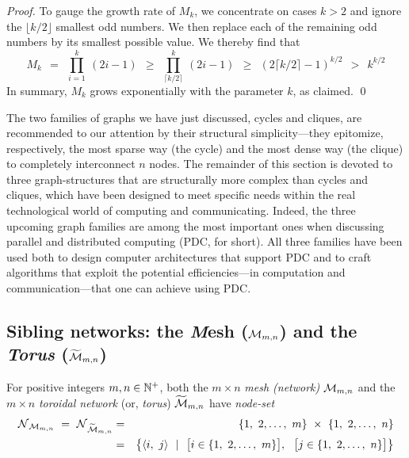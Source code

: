 \begin{proof}
\hspace*{.25in}{\em $M_k$ is the product of the first $k$ odd numbers.}

\noindent
To gauge the growth rate of $M_k$, we concentrate on cases $k > 2$ and
ignore the $\lfloor k/2 \rfloor$ smallest odd numbers.  We then
replace each of the remaining odd numbers by its smallest possible
value.  We thereby find that
\[
M_k \ \ =    \ \ \prod_{i=1}^k \ (2i-1)
    \ \ \geq \ \ \prod_{\lceil k/2 \rceil}^k \ (2i-1)
    \ \ \geq \ \ \left( 2 \lceil k/2 \rceil -1 \right)^{k/2}
    \ \ >    \ \ k^{k/2}
\]
In summary, $M_k$ grows exponentially with the parameter $k$, as claimed.
\qed
\end{proof}


\bigskip

The two families of graphs we have just discussed, cycles and cliques,
are recommended to our attention by their structural simplicity---they
epitomize, respectively, the most sparse way (the cycle) and the most
dense way (the clique) to completely interconnect $n$ nodes.  The
remainder of this section is devoted to three graph-structures that
are structurally more complex than cycles and cliques, which have been
designed to meet specific needs within the real technological world of
computing and communicating.  Indeed, the three upcoming graph
families are among the most important ones when discussing parallel
and distributed computing (PDC, for short).  All three families have
been used both to design computer architectures that support PDC and
to craft algorithms that exploit the potential efficiencies---in
computation and communication---that one can achieve using PDC.

\subsection{Sibling networks: the {\it M}esh ($\mbox{$\cal M$}_{m,n}$) and the {\it Torus} ($\widetilde{\mbox{$\cal M$}}_{m,n}$)}
\label{sec:mesh}

For positive integers $m, n \in \mathbb{N}^+$, both the $m \times n$ {\it mesh
  (network)} $\mbox{$\cal M$}_{m,n}$ and the $m \times n$ {\it toroidal network}
(or, {\it torus}) $\widetilde{\mbox{$\cal M$}}_{m,n}$ have {\it node-set}
\begin{eqnarray*}
\n_{\fm_{m,n}} \ = \ \n_{\widetilde{\fm}_{m,n}}
  & = & 
\{1, \ 2, \ldots, \ m\} \ \times \ \{1, \ 2, \ldots, \ n\} \\
  & = & 
\big\{ \langle i, \ j \rangle \ \ | \ \ 
\big[ i \in \{1, \ 2, \ldots, \ m\} \big], \ \
\big[ j \in \{1, \ 2, \ldots, \ n\} \big]
\big\}
\end{eqnarray*}

